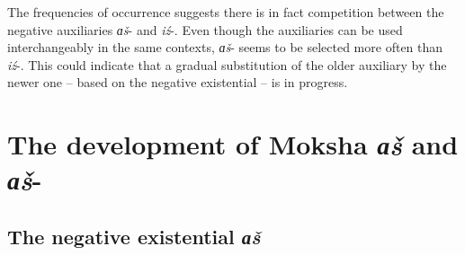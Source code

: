 \documentclass[output=paper,colorlinks,citecolor=brown,draft,draftmode]{langscibook}
\begin{document}
\begin{table}[t]
\small
\caption{Objective conjugations of \textit{ɑš}- vs. \textit{iź}- in the MokshEr corpus (plural object).}
\label{tab:2:10}
\end{table}
  The frequencies of occurrence suggests there is in fact competition between the negative auxiliaries \textit{ɑš}- and \textit{iź}-. Even though the auxiliaries can be used interchangeably in the same contexts, \textit{ɑš}- seems to be selected more often than \textit{iź}-. This could indicate that a gradual substitution of the older auxiliary by the newer one -- based on the negative existential -- is in progress.

\section{The development of Moksha \textit{ɑš} and \textit{ɑš}-}\label{sec:2:7}

\subsection{The negative existential \textit{ɑš}}\label{sec:2:7.1}
\end{document}
